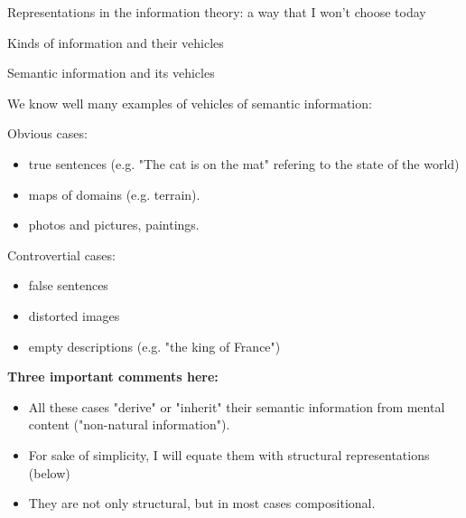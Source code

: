 \documentclass[10pt, aspectratio=169]{beamer}
\begin{document}
\begin{frame} {Representations in the information theory: a way that I won't choose today}
           
            

    \end{frame}


\begin{frame} 
    \begin{center}
      {\Huge  Kinds of information and their vehicles } %
    \end{center}
\end{frame}






\begin{frame}{Semantic information and its vehicles}
 
We know well many examples of vehicles of semantic information:
 
Obvious cases:
\begin{itemize}
    \item true sentences (e.g. "The cat is on the mat" refering to the state of the world)
    \item maps of domains (e.g. terrain).
    \item photos and pictures, paintings.
\end{itemize}

Controvertial cases:
\begin{itemize}
    \item false sentences
    \item distorted images
    \item empty descriptions (e.g. "the king of France")
   
\end{itemize}

\textbf{\color{red} Three important comments here:}
\begin{itemize}
    \item All these cases "derive" or "inherit" their semantic information from mental content ("non-natural information"). 
   \item For sake of simplicity, I will equate them with structural representations (below)
    \item They are not only structural, but in most cases compositional.
\end{itemize}

 \end{frame}
\end{document}
